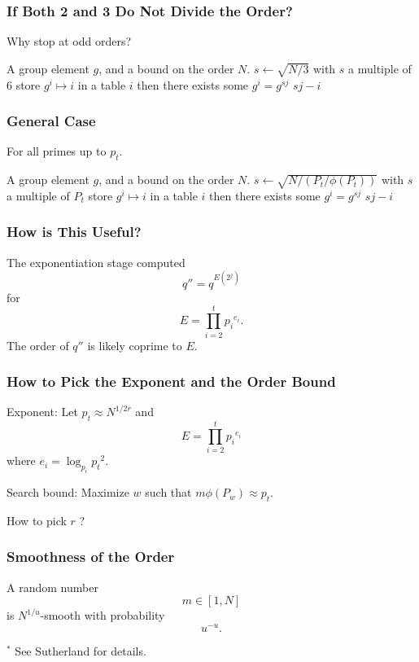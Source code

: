 \documentclass{beamer}
\newcommand{\smallfont}{\fontsize{6pt}{7.2}\selectfont}
\begin{document}
\begin{frame}
\frametitle{If Both 2 and 3 Do Not Divide the Order?}
Why stop at odd orders?

\bigbreak
\begin{algorithmic}[1]
\Require A group element $g$, and a bound on the order $N$.
\State $s \gets \sqrt{N/3}$ with $s$ a multiple of 6
	\State store $g^i \mapsto i$ in a table
	 \Return $i$ \EndIf
\EndFor
{}
		\State then there exists some $g^i = g^{sj}$
		\State \Return $sj - i$
	\EndIf
\EndFor
\end{algorithmic}
\end{frame}

\begin{frame}
\frametitle{General Case}
For all primes up to $p_t$.

\bigbreak
\begin{algorithmic}[1]
\Require A group element $g$, and a bound on the order $N$.
\State $s \gets \sqrt{N/(P_t/\phi(P_t))}$ with $s$ a multiple of $P_t$
	\State store $g^i \mapsto i$ in a table
	 \Return $i$ \EndIf
\EndFor
{}
		\State then there exists some $g^i = g^{sj}$
		\State \Return $sj - i$
	\EndIf
\EndFor
\end{algorithmic}
\end{frame}

\begin{frame}
\frametitle{How is This Useful?}

The exponentiation stage computed
\[
	q'' = q^{E\left(2^j\right)}
\]
for
\[
	E = \prod_{i=2}^t {p_i}^{e_i}.
\]
The order of $q''$ is likely coprime to $E$.
\end{frame}

\begin{frame}
\frametitle{How to Pick the Exponent and the Order Bound}
Exponent: Let $p_t \approx N^{1/2r}$ and
\[
	E = \prod_{i=2}^t {p_i}^{e_i}
\]
where $e_i = \log_{p_i} {p_t}^2$.

\bigbreak
Search bound: Maximize $w$ such that $m\phi(P_w) \approx p_t$.

\bigbreak
How to pick $r$ ?
\end{frame}

\begin{frame}
\frametitle{Smoothness of the Order}
A random number 
\[
m \in [1, N]
\]
is $N^{1/u}$-smooth with probability
\[
u^{-u}.
\]

\bigbreak\bigbreak\bigbreak
\smallfont
${}^*$ See Sutherland for details.
\end{frame}
\end{document}
